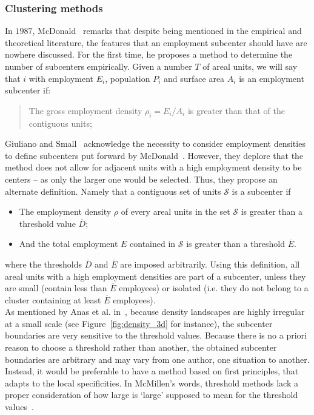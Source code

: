 \subsubsection{Clustering methods}
\label{ssub:clustering_methods}


In $1987$, McDonald~\cite{McDonald:1987} remarks that despite being mentioned
in the empirical and theoretical literature, the features that an employment
subcenter should have are nowhere discussed. For the first time, he proposes a method to
determine the number of subcenters empirically. Given
a number $T$ of areal units, we will say that $i$ with employment $E_i$,
population $P_i$ and surface area $A_i$ is an employment subcenter if:

\begin{quote}
    The gross employment density $\rho_i = E_i/A_i$ is greater than that of the
contiguous units; 
\end{quote}

Giuliano and Small~\cite{Giuliano:1991} acknowledge the necessity to
consider employment densities to define subcenters put forward by
McDonald~\cite{McDonald:1987}. However, they deplore that the method does not
allow for adjacent units with a high employment density to be centers -- as only
the larger one would be selected. Thus, they propose an alternate definition.
Namely that a contiguous set of units $\mathcal{S}$ is a subcenter if 

\begin{itemize}
    \item The employment density $\rho$ of every areal units in the set $\mathcal{S}$ is greater than
        a threshold value  $\overline{D}$;
    \item And the total employment $E$ contained in $\mathcal{S}$ is greater than a threshold
        $\overline{E}$.
\end{itemize}

where the thresholds $\overline{D}$ and $\overline{E}$ are imposed arbitrarily.
Using this definition, all areal units with a high employment densities are part
of a subcenter, unless they are small (contain less than $\overline{E}$
employees) or isolated (i.e. they do not belong to a cluster containing at
least $\overline{E}$ employees).\\


As mentioned by Anas et al. in~\cite{Anas:1998}, because density landscapes are highly
irregular at a small scale (see Figure~\ref{fig:density_3d} for instance), the
subcenter boundaries are very sensitive to the threshold values. Because there
is no a priori reason to choose a threshold rather than another, the obtained
subcenter boundaries are arbitrary and may vary from one author, one situation
to another. Instead, it would be preferable to have a method based on first
principles, that adapts to the local specificities.  In McMillen's words,
threshold methods lack a proper consideration of how large is `large' supposed
to mean for the threshold values~\cite{McMillen:2003}. 

